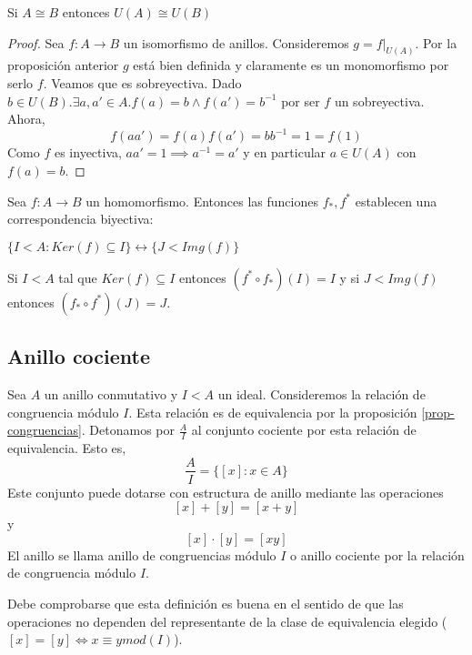 \begin{proposition}
	Si $A \cong B$ entonces $U(A) \cong U(B)$
\end{proposition}
\begin{proof}
	Sea $f:A \to B$ un isomorfismo de anillos. Consideremos $g = f|_{U(A)}$. Por la proposición anterior $g$ está bien definida y claramente es un monomorfismo por serlo $f$. Veamos que es sobreyectiva. Dado $b \in U(B). \exists a,a' \in A. f(a) = b \land f(a') = b^{-1}$ por ser $f$ un sobreyectiva. Ahora, $$f(aa') = f(a)f(a') = bb^{-1} = 1 = f(1)$$ Como $f$ es inyectiva, $aa' = 1 \implies a^{-1} = a'$ y en particular $a \in U(A)$ con $f(a) = b$.  
\end{proof}

\begin{proposition}
Sea $f:A \to B$ un homomorfismo. Entonces las funciones $f_*,f^*$ establecen una correspondencia biyectiva:

$\{I < A:Ker(f) \subseteq I\} \leftrightarrow \{J < Img(f)\}$

Si $I<A$ tal que $Ker(f) \subseteq I$ entonces $(f^*\circ f_*)(I) = I$ y si $J < Img(f)$ entonces $(f_* \circ f^*)(J) = J$. 
\end{proposition}


\subsection{Anillo cociente}

\begin{definition}
	Sea $A$ un anillo conmutativo y $I < A$ un ideal. Consideremos la relación de congruencia módulo $I$. Esta relación es de equivalencia por la proposición \ref{prop-congruencias}. Detonamos por $\frac{A}{I}$ al conjunto cociente por esta relación de equivalencia. Esto es, $$\frac{A}{I} = \{[x]:x \in A\}$$ Este conjunto puede dotarse con estructura de anillo mediante las operaciones $$[x]+[y] = [x+y]$$ y $$[x] \cdot [y] = [xy]$$ El anillo se llama anillo de congruencias módulo $I$ o anillo cociente por la relación de congruencia módulo $I$. 
\end{definition}

Debe comprobarse que esta definición es buena en el sentido de que las operaciones no dependen del representante de la clase de equivalencia elegido ($[x] = [y] \iff x \equiv y mod(I)$).

